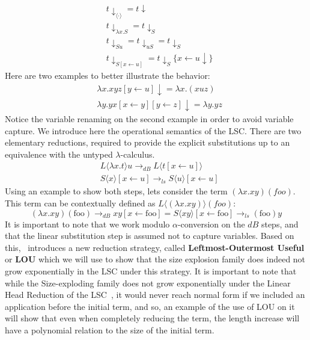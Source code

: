 \documentclass[11pt]{article}
\begin{document}
\begin{equation}
  \begin{split}
    &t\downarrow_{\langle \cdot \rangle} = t\downarrow \\
    &t\downarrow_{\lambda x.S} = t\downarrow_S \\
    &t\downarrow_{Su} = t\downarrow_{uS} = t\downarrow_S \\
    &t\downarrow_{S[x \leftarrow u]} = t\downarrow_S \{x \leftarrow u \downarrow \}
  \end{split}
\end{equation}
Here are two examples to better illustrate the behavior:
\begin{equation}
	\begin{split}
	& \lambda x . xyz[y \leftarrow u]\downarrow = \lambda x . (xuz)\\ 
	& \lambda y . yx [x \leftarrow y][y \leftarrow z]\downarrow = \lambda y.yz
	\end{split}
\end{equation}
Notice the variable renaming on the second example in order to avoid variable capture.
We introduce here the operational semantics of the LSC. There are two elementary reductions, required to provide the explicit substitutions up to an equivalence with the untyped $\lambda$-calculus.
\begin{equation}
  \begin{split}
    &L \langle \lambda x .t \rangle u \rightarrow_{dB} L \langle t [x \leftarrow u] \rangle \\
    &S \langle x \rangle [x \leftarrow u] \rightarrow_{ls} S \langle u \rangle [x \leftarrow u]
  \end{split}
\end{equation}
Using an example to show both steps, lets consider the term $(\lambda x.xy)(foo)$. This term can be contextually defined as $L \langle (\lambda x.xy) \rangle (foo)$:
\begin{equation*}
  (\lambda x.xy)(\text{foo}) \rightarrow_{dB} xy[x \leftarrow \text{foo}] = S \langle xy \rangle [x \leftarrow \text{foo}] \rightarrow_{ls} (\text{foo})y
\end{equation*}
It is important to note that we work modulo $\alpha$-conversion on the $dB$ steps, and that the linear substitution step is assumed not to capture variables.
Based on this,~\cite{beta-invariance} introduces a new reduction strategy, called \textbf{Leftmost-Outermost Useful} or \textbf{LOU} which we will use to show that the size explosion family does indeed not grow exponentially in the LSC under this strategy. It is important to note that while the Size-exploding family does not grow exponentially under the Linear Head Reduction of the LSC~\cite{invariance-of-cost-model}, it would never reach normal form if we included an application before the initial term, and so, an example of the use of LOU on it will show that even when completely reducing the term, the length increase will have a polynomial relation to the size of the initial term.
\end{document}
